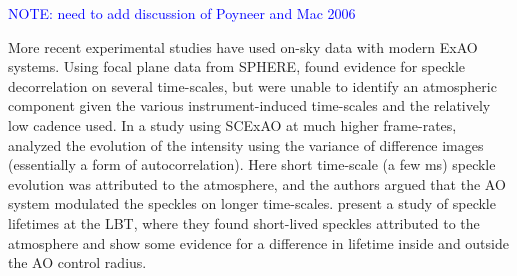 \documentclass[10pt,preprint]{aastex631}
\newcommand{\jrmadd}[1]{\textcolor{blue}{#1}}
\begin{document}
\jrmadd{NOTE: need to add discussion of Poyneer and Mac 2006}

More recent experimental studies have used on-sky data with modern ExAO systems.  Using focal plane data from SPHERE, \citet{2016SPIE.9909E..4ZM} found evidence for speckle decorrelation on several time-scales, but were unable to identify an atmospheric component given the various instrument-induced time-scales and the relatively low cadence used. In a study using SCExAO at much higher frame-rates, \citet{2018PASP..130j4502G} analyzed the evolution of the intensity using the variance of difference images (essentially a form of autocorrelation).  Here short time-scale (a few ms) speckle evolution was attributed to the atmosphere, and the authors argued that the AO system modulated the speckles on longer time-scales.  \citet{2017JATIS...3b5001S} present a study of speckle lifetimes at the LBT, where they found short-lived speckles attributed to the atmosphere and show some evidence for a difference in lifetime inside and outside the AO control radius.
\end{document}

